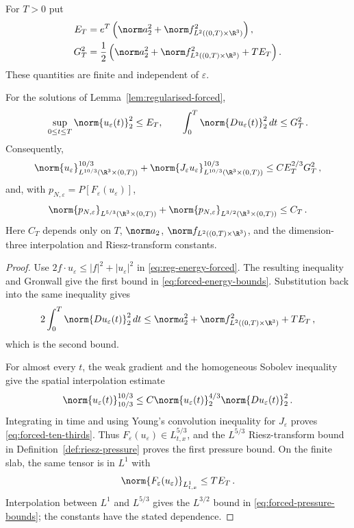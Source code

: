 \documentclass[11pt,reqno]{amsart}
\begin{document}
For $T>0$ put
\begin{align*}
 E_T&=e^T\left(\norm a_2^2+
                \norm f_{L^2((0,T)\times\R^3)}^2\right),\\
 G_T^2&=\frac12\left(\norm a_2^2+
                \norm f_{L^2((0,T)\times\R^3)}^2+T E_T\right).
\end{align*}
These quantities are finite and independent of $\varepsilon$.

\begin{lemma}\label{lem:forced-energy-bounds}
For the solutions of Lemma~\ref{lem:regularised-forced},
\begin{equation}\label{eq:forced-energy-bounds}
 \sup_{0\le t\le T}\norm{u_\varepsilon(t)}_2^2\le E_T,
 \qquad \int_0^T\norm{Du_\varepsilon(t)}_2^2\,dt\le G_T^2\,.
\end{equation}
Consequently,
\begin{equation}\label{eq:forced-ten-thirds}
 \norm{u_\varepsilon}_{L^{10/3}(\R^3\times(0,T))}^{10/3}
 +\norm{J_\varepsilon u_\varepsilon}_{L^{10/3}(\R^3\times(0,T))}^{10/3}
 \le C E_T^{2/3}G_T^2\,,
\end{equation}
and, with $p_{N,\varepsilon}=P[F_\varepsilon(u_\varepsilon)]$,
\begin{equation}\label{eq:forced-pressure-bounds}
 \norm{p_{N,\varepsilon}}_{L^{5/3}(\R^3\times(0,T))}
 +\norm{p_{N,\varepsilon}}_{L^{3/2}(\R^3\times(0,T))}
 \le C_T\,.
\end{equation}
Here $C_T$ depends only on $T$, $\norm a_2$, $\norm f_{L^2((0,T)\times\R^3)}$, and the dimension-three interpolation and Riesz-transform constants.
\end{lemma}

\begin{proof}
Use $2f\cdot u_\varepsilon\le |f|^2+|u_\varepsilon|^2$ in
\eqref{eq:reg-energy-forced}. The resulting inequality and Gronwall give
the first bound in \eqref{eq:forced-energy-bounds}. Substitution back into
the same inequality gives
\[
 2\int_0^T\norm{Du_\varepsilon(t)}_2^2\,dt
 \le \norm a_2^2+\norm f_{L^2((0,T)\times\R^3)}^2+T E_T\,,
\]
which is the second bound.

For almost every $t$, the weak gradient and the homogeneous Sobolev
inequality give the spatial interpolation estimate
\[
 \norm{u_\varepsilon(t)}_{10/3}^{10/3}
 \le C\norm{u_\varepsilon(t)}_2^{4/3}
             \norm{Du_\varepsilon(t)}_2^2\,.
\]
Integrating in time and using Young's convolution inequality for
$J_\varepsilon$ proves \eqref{eq:forced-ten-thirds}. Thus
$F_\varepsilon(u_\varepsilon)\in L^{5/3}_{t,x}$, and the $L^{5/3}$
Riesz-transform bound in Definition~\ref{def:riesz-pressure} proves the
first pressure bound. On the finite slab, the same tensor is in $L^1$ with
\[
 \norm{F_\varepsilon(u_\varepsilon)}_{L^1_{t,x}}
 \le T E_T\,.
\]
Interpolation between $L^1$ and $L^{5/3}$ gives the $L^{3/2}$ bound in
\eqref{eq:forced-pressure-bounds}; the constants have the stated
dependence.
\end{proof}
\end{document}
